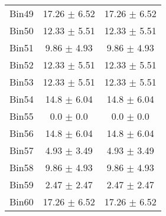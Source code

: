 \begin{tabular}{|c|c|c|}
     Bin49 & 17.26 $\pm$ 6.52 & 17.26 $\pm$ 6.52 \\ \cline{1-3} 
     Bin50 & 12.33 $\pm$ 5.51 & 12.33 $\pm$ 5.51 \\ \cline{1-3} 
     Bin51 & 9.86 $\pm$ 4.93 & 9.86 $\pm$ 4.93 \\ \cline{1-3} 
     Bin52 & 12.33 $\pm$ 5.51 & 12.33 $\pm$ 5.51 \\ \cline{1-3} 
     Bin53 & 12.33 $\pm$ 5.51 & 12.33 $\pm$ 5.51 \\ \cline{1-3} 
     Bin54 & 14.8 $\pm$ 6.04 & 14.8 $\pm$ 6.04 \\ \cline{1-3} 
     Bin55 & 0.0 $\pm$ 0.0 & 0.0 $\pm$ 0.0 \\ \cline{1-3} 
     Bin56 & 14.8 $\pm$ 6.04 & 14.8 $\pm$ 6.04 \\ \cline{1-3} 
     Bin57 & 4.93 $\pm$ 3.49 & 4.93 $\pm$ 3.49 \\ \cline{1-3} 
     Bin58 & 9.86 $\pm$ 4.93 & 9.86 $\pm$ 4.93 \\ \cline{1-3} 
     Bin59 & 2.47 $\pm$ 2.47 & 2.47 $\pm$ 2.47 \\ \cline{1-3} 
     Bin60 & 17.26 $\pm$ 6.52 & 17.26 $\pm$ 6.52 \\ \cline{1-3} 
  \end{tabular}
